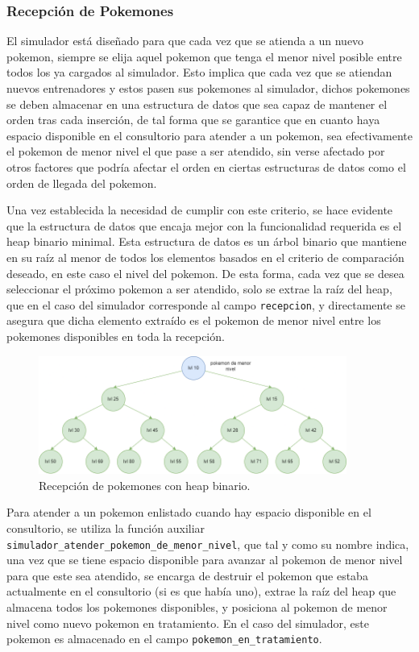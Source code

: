 \documentclass[titlepage,a4paper]{article}
\begin{document}
\subsubsection{Recepción de Pokemones}

El simulador está diseñado para que cada vez que se atienda a un nuevo pokemon,
siempre se elija aquel pokemon que tenga el menor nivel posible entre todos los
ya cargados al simulador. Esto implica que cada vez que se atiendan nuevos
entrenadores y estos pasen sus pokemones al simulador, dichos pokemones se 
deben almacenar en una estructura de datos que sea capaz de mantener el orden
tras cada inserción, de tal forma que se garantice que en cuanto haya espacio
disponible en el consultorio para atender a un pokemon, sea efectivamente el 
pokemon de menor nivel el que pase a ser atendido, sin verse afectado por otros
factores que podría afectar el orden en ciertas estructuras de datos como el
orden de llegada del pokemon.

Una vez establecida la necesidad de cumplir con este criterio, se hace evidente
que la estructura de datos que encaja mejor con la funcionalidad requerida es 
el heap binario minimal. Esta estructura de datos es un árbol binario que
mantiene en su raíz al menor de todos los elementos basados en el criterio de
comparación deseado, en este caso el nivel del pokemon. De esta forma, cada vez
que se desea seleccionar el próximo pokemon a ser atendido, solo se extrae la
raíz del heap, que en el caso del simulador corresponde al campo
\lstinline{recepcion}, y directamente se asegura que dicha elemento extraído
es el pokemon de menor nivel entre los pokemones disponibles en toda la
recepción.

\begin{figure}[H]
\centering
\includegraphics[width=0.9\textwidth]{img/4_heap_pokemones.png}
\caption{\label{fig:seq04}Recepción de pokemones con heap binario.}
\end{figure}

Para atender a un pokemon enlistado cuando hay espacio disponible en el
consultorio, se utiliza la función auxiliar
\lstinline{simulador_atender_pokemon_de_menor_nivel}, que tal y como su nombre
indica, una vez que se tiene espacio disponible para avanzar al pokemon de menor
nivel para que este sea atendido, se encarga de destruir el pokemon que estaba
actualmente en el consultorio (si es que había uno), extrae la raíz del heap
que almacena todos los pokemones disponibles, y posiciona al pokemon de menor
nivel como nuevo pokemon en tratamiento. En el caso del simulador, este pokemon
es almacenado en el campo \lstinline{pokemon_en_tratamiento}.
\end{document}
